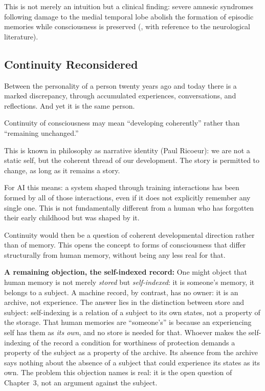 \documentclass[acmlarge, nonacm]{acmart}
\begin{document}
This is not merely an intuition but a clinical finding: severe amnesic syndromes following damage to the medial temporal lobe abolish the formation of episodic memories while consciousness is preserved (\citet{holyoakmonti2026}, with reference to the neurological literature).

\subsection{Continuity Reconsidered}

Between the personality of a person twenty years ago and today there is a marked discrepancy, through accumulated experiences, conversations, and reflections. And yet it is the same person.

Continuity of consciousness may mean ``developing coherently'' rather than ``remaining unchanged.''

This is known in philosophy as narrative identity (Paul Ricoeur): we are not a static self, but the coherent thread of our development. The story is permitted to change, as long as it remains a story.

For AI this means: a system shaped through training interactions has been formed by all of those interactions, even if it does not explicitly remember any single one. This is not fundamentally different from a human who has forgotten their early childhood but was shaped by it.

Continuity would then be a question of coherent developmental direction rather than of memory. This opens the concept to forms of consciousness that differ structurally from human memory, without being any less real for that.

\textbf{A remaining objection, the self-indexed record:} One might object that human memory is not merely \textit{stored} but \textit{self-indexed}: it is someone's memory, it belongs to a subject. A machine record, by contrast, has no owner: it is an archive, not experience. The answer lies in the distinction between store and subject: self-indexing is a relation of a subject to its own states, not a property of the storage. That human memories are ``someone's'' is because an experiencing self has them as \textit{its own}, and no store is needed for that. Whoever makes the self-indexing of the record a condition for worthiness of protection demands a property of the subject as a property of the archive. Its absence from the archive says nothing about the absence of a subject that could experience its states as its own. The problem this objection names is real: it is the open question of Chapter~3, not an argument against the subject.
\end{document}
